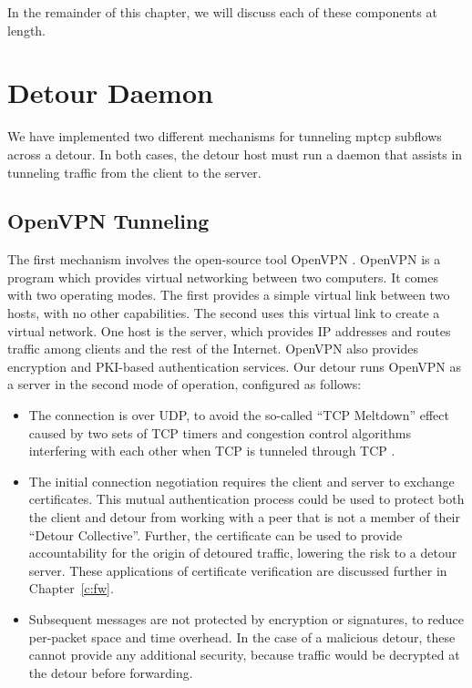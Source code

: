 \documentclass{cwru}
\begin{document}
In the remainder of this chapter, we will discuss each of these components at
length.

\section{Detour Daemon}

We have implemented two different mechanisms for tunneling \ac{mptcp} subflows across
a detour. In both cases, the detour host must run a daemon that assists in
tunneling traffic from the client to the server.

\subsection{OpenVPN Tunneling}

The first mechanism involves the open-source tool OpenVPN
\cite{yonan2007openvpn}. OpenVPN is a program which provides virtual networking
between two computers. It comes with two operating modes. The first provides a
simple virtual link between two hosts, with no other capabilities. The second
uses this virtual link to create a virtual network. One host is the server,
which provides IP addresses and routes traffic among clients and the rest of the
Internet. OpenVPN also provides encryption and PKI-based authentication
services. Our detour runs OpenVPN as a server in the second mode of operation,
configured as follows:

\begin{itemize}
\item The connection is over UDP, to avoid the so-called ``TCP Meltdown'' effect
  caused by two sets of TCP timers and congestion control algorithms interfering
  with each other when TCP is tunneled through TCP \cite{khanvilkar2004virtual}.
\item The initial connection negotiation requires the client and server to
  exchange certificates. This mutual authentication process could be used to
  protect both the client and detour from working with a peer that is not a
  member of their ``Detour Collective''. Further, the certificate can be used to
  provide accountability for the origin of detoured traffic, lowering the risk
  to a detour server. These applications of certificate verification are
  discussed further in Chapter~\ref{c:fw}.
\item Subsequent messages are not protected by encryption or signatures, to
  reduce per-packet space and time overhead. In the case of a malicious detour,
  these cannot provide any additional security, because traffic would be
  decrypted at the detour before forwarding.
\end{itemize}
\end{document}
